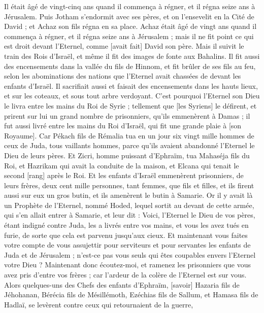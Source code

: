 \begin{multicols}{2}
Il était âgé de vingt-cinq ans quand il commença à régner, et il régna seize ans à Jérusalem.
Puis Jotham s'endormit avec ses pères, et on l'ensevelit en la Cité de David ; et Achaz son fils régna en sa place.
\VerseOne{}Achaz était âgé de vingt ans quand il commença à régner, et il régna seize ans à Jérusalem ; mais il ne fit point ce qui est droit devant l'Eternel, comme [avait fait] David son père.
Mais il suivit le train des Rois d'Israël, et même il fit des images de fonte aux Bahalins.
Il fit aussi des encensements dans la vallée du fils de Hinnom, et fit brûler de ses fils au feu, selon les abominations des nations que l'Eternel avait chassées de devant les enfants d'Israël.
Il sacrifiait aussi et faisait des encensements dans les hauts lieux, et sur les coteaux, et sous tout arbre verdoyant.
C'est pourquoi l'Eternel son Dieu le livra entre les mains du Roi de Syrie ; tellement que [les Syriens] le défirent, et prirent sur lui un grand nombre de prisonniers, qu'ils emmenèrent à Damas ; il fut aussi livré entre les mains du Roi d'Israël, qui fit une grande plaie à [son Royaume].
Car Pékach fils de Rémalia tua en un jour six vingt mille hommes de ceux de Juda, tous vaillants hommes, parce qu'ils avaient abandonné l'Eternel le Dieu de leurs pères.
Et Zicri, homme puissant d'Ephraïm, tua Mahaséja fils du Roi, et Hazrikam qui avait la conduite de la maison, et Elcana qui tenait le second [rang] après le Roi.
Et les enfants d'Israël emmenèrent prisonniers, de leurs frères, deux cent mille personnes, tant femmes, que fils et filles, et ils firent aussi sur eux un gros butin, et ils amenèrent le butin à Samarie.
Or il y avait là un Prophète de l'Eternel, nommé Hoded, lequel sortit au devant de cette armée, qui s'en allait entrer à Samarie, et leur dit : Voici, l'Eternel le Dieu de vos pères, étant indigné contre Juda, les a livrés entre vos mains, et vous les avez tués en furie, de sorte que cela est parvenu jusqu'aux cieux.
Et maintenant vous faites votre compte de vous assujettir pour serviteurs et pour servantes les enfants de Juda et de Jérusalem ; n'est-ce pas vous seuls qui êtes coupables envers l'Eternel votre Dieu ?
Maintenant donc écoutez-moi, et ramenez les prisonniers que vous avez pris d'entre vos frères ; car l'ardeur de la colère de l'Eternel est sur vous.
Alors quelques-uns des Chefs des enfants d'Ephraïm, [savoir] Hazaria fils de Jéhohanan, Bérécia fils de Mésillémoth, Ezéchias fils de Sallum, et Hamasa fils de Hadlaï, se levèrent contre ceux qui retournaient de la guerre,

\end{multicols}
